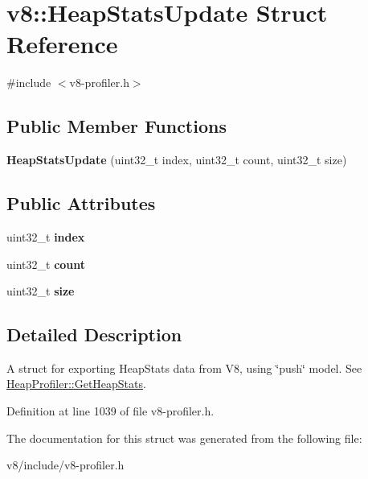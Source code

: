 \hypertarget{structv8_1_1HeapStatsUpdate}{}\section{v8\+:\+:Heap\+Stats\+Update Struct Reference}
\label{structv8_1_1HeapStatsUpdate}


{\ttfamily \#include $<$v8-\/profiler.\+h$>$}

\subsection*{Public Member Functions}
\begin{DoxyCompactItemize}
\item 
\mbox{\label{structv8_1_1HeapStatsUpdate_aba606181fa7071647cc91a558c450cf3}} 
{\bfseries Heap\+Stats\+Update} (uint32\+\_\+t index, uint32\+\_\+t count, uint32\+\_\+t size)
\end{DoxyCompactItemize}
\subsection*{Public Attributes}
\begin{DoxyCompactItemize}
\item 
\mbox{\label{structv8_1_1HeapStatsUpdate_a90f427acc6e9b8cf2001ca09541545d7}} 
uint32\+\_\+t {\bfseries index}
\item 
\mbox{\label{structv8_1_1HeapStatsUpdate_aa74badb1bd196e538b45b971350c33de}} 
uint32\+\_\+t {\bfseries count}
\item 
\mbox{\label{structv8_1_1HeapStatsUpdate_a842a199bd372f411f0ae5816e38c45e2}} 
uint32\+\_\+t {\bfseries size}
\end{DoxyCompactItemize}


\subsection{Detailed Description}
A struct for exporting Heap\+Stats data from V8, using \char`\"{}push\char`\"{} model. See \mbox{\hyperlink{classv8_1_1HeapProfiler_add093717acd067daeddb7ef5fc8b191a}{Heap\+Profiler\+::\+Get\+Heap\+Stats}}. 

Definition at line 1039 of file v8-\/profiler.\+h.



The documentation for this struct was generated from the following file\+:\begin{DoxyCompactItemize}
\item 
v8/include/v8-\/profiler.\+h\end{DoxyCompactItemize}
